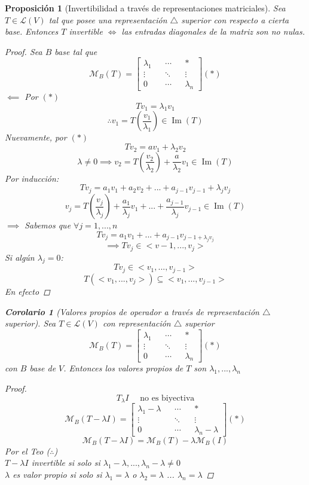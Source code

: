 \documentclass[11pt]{book}
\DeclareMathOperator{\Ima}{Im}
\newtheorem{prop}[thm]{Proposición}
\newtheorem*{cor}{Corolario}
\theoremstyle{definition}
\begin{document}
\begin{prop}[Invertibilidad a través de representaciones matriciales]
	Sea $T\in\mathcal{L}(V)$ tal que posee una representación $\triangle$ superior con respecto a cierta base. Entonces $T$ invertible $\iff$ las entradas diagonales de la matriz son no nulas.
	\begin{proof}
		Sea $B$ base tal que
		\[\mathcal{M}_B(T)=\begin{bmatrix}
				\lambda_1 &  & \cdots &  & *         \\
				\vdots    &  & \ddots &  & \vdots    \\
				0         &  & \cdots &  & \lambda_n
			\end{bmatrix}(*)\]
		$\impliedby$ Por $(*)$
		\[Tv_1=\lambda_1v_1\]
		\[\therefore v_1=T\left(\frac{v_1}{\lambda_1}\right)\in \Ima(T)\]
		Nuevamente, por $(*)$
		\[Tv_2=av_1+\lambda_2v_2\]
		\[\lambda\neq 0\implies v_2=T\left(\frac{v_2}{\lambda_2}\right)+\frac{a}{\lambda_2}v_1\in\Ima(T)\]
		Por inducción:
		\[Tv_j=a_1v_1+a_2v_2+...+a_{j-1}v_{j-1}+\lambda_jv_j\]
		\[v_j=T\left(\frac{v_j}{\lambda_j}\right)+\frac{a_1}{\lambda_j}v_1+...+\frac{a_{j-1}}{\lambda_j}v_{j-1}\in\Ima(T)\]
		$\implies$ Sabemos que $\forall j=1,...,n$
		\[Tv_j=a_1v_1+...+a_{j-1}v_{j-1+\lambda_jv_j}\]
		\[\implies Tv_j\in<v-1,...,v_j>\]
		Si algún $\lambda_j=0$:
		\[Tv_j\in<v_1,...,v_{j-1}>\]
		\[T(<v_1,...,v_j>)\subseteq <v_1,...,v_{j-1}>\]
		En efecto
	\end{proof}
	\begin{cor}[Valores propios de operador a través de representación $\triangle$ superior]
		Sea $T\in\mathcal{L}(V)$ con representación $\triangle$ superior
		\[\mathcal{M}_B(T)=\begin{bmatrix}
				\lambda_1 &  & \cdots &  & *         \\
				\vdots    &  & \ddots &  & \vdots    \\
				0         &  & \cdots &  & \lambda_n
			\end{bmatrix}(*)\]
		con $B$ base de $V$. Entonces los valores propios de $T$ son $\lambda_1,...,\lambda_n$
		\begin{proof}
			\[T_\lambda I\quad\textrm{ no es biyectiva}\]
			\[\mathcal{M}_B(T-\lambda I)=\begin{bmatrix}
					\lambda_1-\lambda &  & \cdots &  & *                 \\
					\vdots            &  & \ddots &  & \vdots            \\
					0                 &  & \cdots &  & \lambda_n-\lambda
				\end{bmatrix}(*)\]
			\[\mathcal{M}_B(T-\lambda I)=\mathcal{M}_B(T)-\lambda\mathcal{M}_B(I)\]
			Por el Teo ($\therefore$)\\
			$T-\lambda I$ invertible si solo si $\lambda_1-\lambda,...,\lambda_n-\lambda\neq 0$\\
			$\lambda$ es valor propio si solo si $\lambda_1=\lambda$ o $\lambda_2=\lambda$ ... $\lambda_n=\lambda$
		\end{proof}
	\end{cor}
\end{prop}
\end{document}
